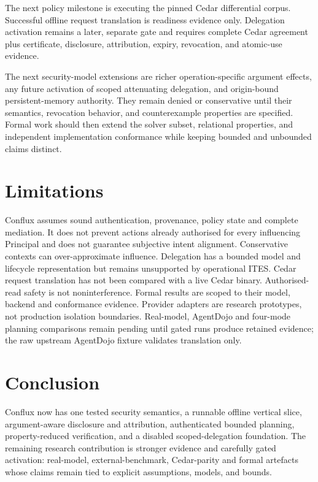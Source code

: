 \documentclass[11pt]{article}
\begin{document}
The next policy milestone is executing the pinned Cedar differential corpus.
Successful offline request translation is readiness evidence only. Delegation
activation remains a later, separate gate and requires complete Cedar agreement
plus certificate, disclosure, attribution, expiry, revocation, and atomic-use
evidence.

The next security-model extensions are richer operation-specific argument
effects, any future activation of scoped attenuating delegation, and
origin-bound persistent-memory authority. They remain denied or conservative
until their semantics, revocation behavior, and counterexample properties are
specified. Formal work should then extend
the solver subset, relational properties, and independent implementation
conformance while keeping bounded and unbounded claims distinct.

\section{Limitations}
Conflux assumes sound authentication, provenance, policy state and complete
mediation. It does not prevent actions already authorised for every influencing
Principal and does not guarantee subjective intent alignment. Conservative
contexts can over-approximate influence. Delegation has a bounded model and
lifecycle representation but remains unsupported by operational ITES. Cedar
request translation has not been compared with a live Cedar binary.
Authorised-read safety is not noninterference. Formal results are scoped to
their model, backend and conformance evidence. Provider adapters are research
prototypes, not production isolation boundaries. Real-model, AgentDojo and
four-mode planning comparisons remain pending until gated runs produce retained
evidence; the raw upstream AgentDojo fixture validates translation only.

\section{Conclusion}
Conflux now has one tested security semantics, a runnable offline vertical
slice, argument-aware disclosure and attribution, authenticated bounded
planning, property-reduced verification, and a disabled scoped-delegation
foundation. The remaining research contribution is stronger evidence and
carefully gated activation: real-model, external-benchmark, Cedar-parity and
formal artefacts whose claims remain tied to explicit assumptions, models, and
bounds.



\end{document}
